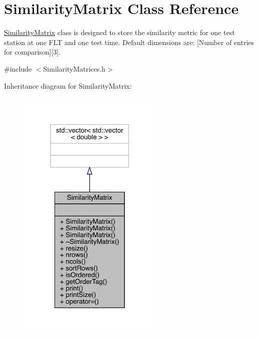 \hypertarget{class_similarity_matrix}{}\section{Similarity\+Matrix Class Reference}
\label{class_similarity_matrix}


\mbox{\hyperlink{class_similarity_matrix}{Similarity\+Matrix}} class is designed to store the similarity metric for one test station at one F\+LT and one test time. Default dimensions are\+: \mbox{[}Number of entries for comparison\mbox{]}\mbox{[}3\mbox{]}.  




{\ttfamily \#include $<$Similarity\+Matrices.\+h$>$}



Inheritance diagram for Similarity\+Matrix\+:
\nopagebreak
\begin{figure}[H]
\begin{center}
\leavevmode
\includegraphics[width=197pt]{class_similarity_matrix__inherit__graph}
\end{center}
\end{figure}



